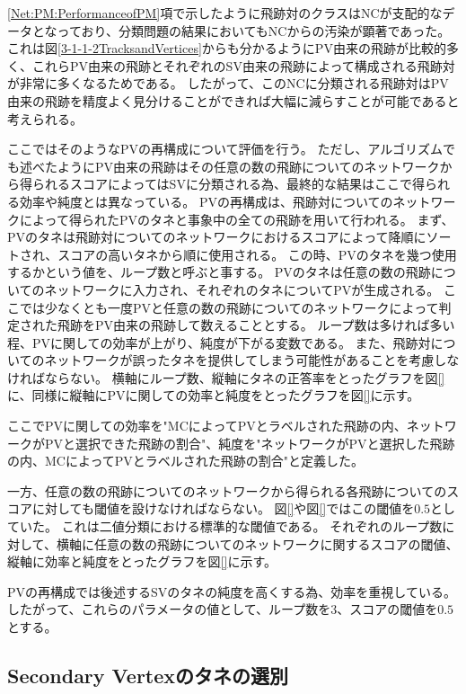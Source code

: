 \ref{Net:PM:PerformanceofPM}項で示したように飛跡対のクラスはNCが支配的なデータとなっており、分類問題の結果においてもNCからの汚染が顕著であった。
これは図\ref{3-1-1-2TracksandVertices}からも分かるようにPV由来の飛跡が比較的多く、これらPV由来の飛跡とそれぞれのSV由来の飛跡によって構成される飛跡対が非常に多くなるためである。
したがって、このNCに分類される飛跡対はPV由来の飛跡を精度よく見分けることができれば大幅に減らすことが可能であると考えられる。

ここではそのようなPVの再構成について評価を行う。
ただし、アルゴリズムでも述べたようにPV由来の飛跡はその任意の数の飛跡についてのネットワークから得られるスコアによってはSVに分類される為、最終的な結果はここで得られる効率や純度とは異なっている。
PVの再構成は、飛跡対についてのネットワークによって得られたPVのタネと事象中の全ての飛跡を用いて行われる。
まず、PVのタネは飛跡対についてのネットワークにおけるスコアによって降順にソートされ、スコアの高いタネから順に使用される。
この時、PVのタネを幾つ使用するかという値を、ループ数と呼ぶと事する。
PVのタネは任意の数の飛跡についてのネットワークに入力され、それぞれのタネについてPVが生成される。
ここでは少なくとも一度PVと任意の数の飛跡についてのネットワークによって判定された飛跡をPV由来の飛跡して数えることとする。
ループ数は多ければ多い程、PVに関しての効率が上がり、純度が下がる変数である。
また、飛跡対についてのネットワークが誤ったタネを提供してしまう可能性があることを考慮しなければならない。
横軸にループ数、縦軸にタネの正答率をとったグラフを図\ref{}に、同様に縦軸にPVに関しての効率と純度をとったグラフを図\ref{}に示す。

ここでPVに関しての効率を"MCによってPVとラベルされた飛跡の内、ネットワークがPVと選択できた飛跡の割合"、純度を"ネットワークがPVと選択した飛跡の内、MCによってPVとラベルされた飛跡の割合"と定義した。

一方、任意の数の飛跡についてのネットワークから得られる各飛跡についてのスコアに対しても閾値を設けなければならない。
図\ref{}や図\ref{}ではこの閾値を$0.5$としていた。
これは二値分類における標準的な閾値である。
それぞれのループ数に対して、横軸に任意の数の飛跡についてのネットワークに関するスコアの閾値、縦軸に効率と純度をとったグラフを図\ref{}に示す。


PVの再構成では後述するSVのタネの純度を高くする為、効率を重視している。
したがって、これらのパラメータの値として、ループ数を$3$、スコアの閾値を$0.5$とする。


\subsection{Secondary Vertexのタネの選別} \label{VFDL:AlgoVFDL:SelectionofSecondaryVertexSeed}

